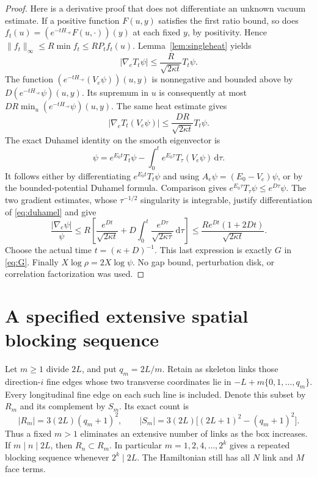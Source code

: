 \documentclass[11pt]{article}
\newcommand{\dd}{\,\mathrm d}
\begin{document}
\begin{proof}
Here is a derivative proof that does not differentiate an unknown
vacuum estimate. If a positive function $F(u,y)$ satisfies the first
ratio bound, so does
$f_t(u)=(e^{-tH_{\neg e}}F(u,\cdot))(y)$ at each fixed $y$, by
positivity. Hence $\|f_t\|_\infty\leq R\min f_t\leq RP_t f_t(u)$.
Lemma~\ref{lem:singleheat} yields
\[
 |\nabla_e T_t\psi|\leq\frac{R}{\sqrt{2\kappa t}}T_t\psi.
\]
The function $(e^{-tH_{\neg e}}(V_e\psi))(u,y)$ is nonnegative and
bounded above by $D(e^{-tH_{\neg e}}\psi)(u,y)$. Its supremum in $u$
is consequently at most $DR\min_u(e^{-tH_{\neg e}}\psi)(u,y)$.
The same heat estimate gives
\[
 |\nabla_e T_t(V_e\psi)|\leq\frac{DR}{\sqrt{2\kappa t}}T_t\psi.
\]
The exact Duhamel identity on the smooth eigenvector is
\begin{equation}\label{eq:duhamel}
 \psi=e^{E_0t}T_t\psi-\int_0^t e^{E_0\tau}T_\tau(V_e\psi)\dd\tau.
\end{equation}
It follows either by differentiating $e^{E_0t}T_t\psi$ and using
$A_e\psi=(E_0-V_e)\psi$, or by the bounded-potential Duhamel formula.
Comparison gives $e^{E_0\tau}T_\tau\psi\leq e^{D\tau}\psi$.
The two gradient estimates, whose $\tau^{-1/2}$ singularity is
integrable, justify differentiation of \eqref{eq:duhamel} and give
\[
 \frac{|\nabla_e\psi|}{\psi}
 \leq R\left[\frac{e^{Dt}}{\sqrt{2\kappa t}}
       +D\int_0^t\frac{e^{D\tau}}{\sqrt{2\kappa\tau}}\dd\tau\right]
 \leq\frac{Re^{Dt}(1+2Dt)}{\sqrt{2\kappa t}}.
\]
Choose the actual time $t=(\kappa+D)^{-1}$. This last expression is
exactly $G$ in \eqref{eq:G}. Finally $X\log\rho=2X\log\psi$.
No gap bound, perturbation disk, or correlation factorization was used.
\end{proof}

\section{A specified extensive spatial blocking sequence}

Let $m\geq1$ divide $2L$, and put $q_m=2L/m$. Retain as skeleton links
those direction-$i$ fine edges whose two transverse coordinates lie in
$-L+m\{0,1,\ldots,q_m\}$. Every longitudinal fine edge on each such
line is included. Denote this subset by $R_m$ and its complement by $S_m$.
Its exact count is
\begin{equation}\label{eq:counts}
 |R_m|=3(2L)(q_m+1)^2,\qquad
 |S_m|=3(2L)\bigl[(2L+1)^2-(q_m+1)^2\bigr].
\end{equation}
Thus a fixed $m>1$ eliminates an extensive number of links as the box
increases. If $m\mid n\mid2L$, then $R_n\subset R_m$. In particular
$m=1,2,4,\ldots,2^k$ gives a repeated blocking sequence whenever $2^k\mid2L$.
The Hamiltonian still has all $N$ link and $M$ face terms.
\end{document}
